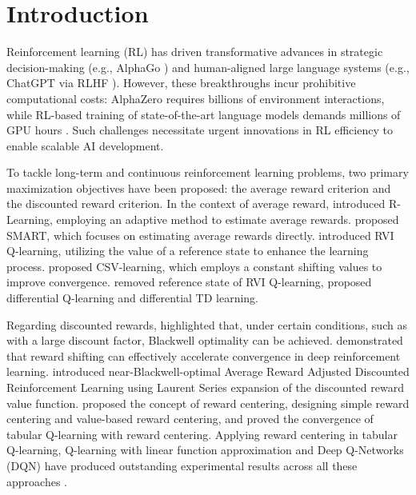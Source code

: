 \section{Introduction}
\label{introduction}
Reinforcement learning (RL) has driven transformative advances 
in strategic decision-making (e.g., AlphaGo \citep{silver2016mastering}) and 
human-aligned large language systems 
(e.g., ChatGPT via RLHF \citep{ouyang2022training,carta2023grounding,dai2024safe,guo2025deepseek}). 
However, these breakthroughs incur prohibitive computational costs:
AlphaZero requires billions of environment interactions, while
 RL-based training of state-of-the-art language models demands
  millions of GPU hours \citep{patterson2021carbon}.
   Such challenges necessitate urgent 
   innovations in RL efficiency to enable scalable 
    AI development.
    
 
 To tackle long-term and continuous reinforcement learning problems,
  two primary maximization objectives have been proposed: 
  the average reward criterion and the discounted reward criterion.
 In the context of average reward, 
 \citet{schwartz1993reinforcement} introduced
 R-Learning, employing an adaptive method to estimate average rewards.
 \citet{das1999solving} proposed SMART, which focuses on 
 estimating average rewards  directly. 
 \citet{abounadi2001learning} introduced RVI Q-learning, utilizing the value of a
 reference state to enhance the learning process. 
 \citet{yang2016efficient} proposed
 CSV-learning, which employs a constant shifting values to improve convergence.
 \citet{wan2021learning} removed reference state of RVI Q-learning, proposed
 differential Q-learning and differential TD learning.

Regarding discounted rewards, \citet{perotto2018tuning,grand2024reducing}  highlighted that, under certain
conditions, such as with a large discount factor, Blackwell optimality can be
achieved. \citet{sun2022exploit} demonstrated that reward shifting can effectively
accelerate convergence in deep reinforcement learning. 
\citet{schneckenreither2025average} introduced near-Blackwell-optimal Average Reward Adjusted
Discounted Reinforcement Learning using Laurent Series expansion of the discounted
reward value function. 
\citet{naik2024reward,naik2024reinforcement} proposed the concept of reward centering,
designing simple reward centering and value-based reward centering, and proved
the convergence of tabular Q-learning with reward centering. 
Applying reward centering in tabular Q-learning, 
Q-learning with linear function approximation 
and Deep Q-Networks (DQN) have produced outstanding experimental 
results across all these approaches \citep{naik2024reward}.    
 
